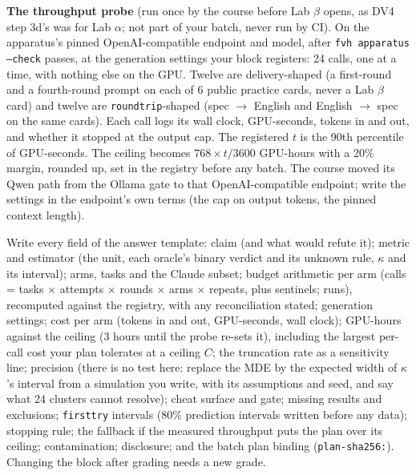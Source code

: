 \documentclass[11pt]{article}
\begin{document}
\begin{problem}
\textbf{The throughput probe} (run once by the course before Lab $\beta$
opens, as DV4 step 3d's was for Lab $\alpha$; not part of your batch, never
run by CI). On the apparatus's pinned
OpenAI-compatible endpoint and model, after \texttt{fvh apparatus --check}
passes, at the generation settings your block registers: 24 calls, one at a
time, with nothing else on the GPU. Twelve are delivery-shaped (a first-round
and a fourth-round prompt on each of 6 public practice cards, never a Lab
$\beta$ card) and twelve are \texttt{roundtrip}-shaped (spec $\to$ English and
English $\to$ spec on the same cards). Each call logs its wall clock,
GPU-seconds, tokens in and out, and whether it stopped at the output cap. The
registered $t$ is the 90th percentile of GPU-seconds. The ceiling becomes $768
\times t / 3600$ GPU-hours with a 20\% margin, rounded up, set in the
registry before any batch. The course moved its Qwen path from the Ollama
gate to that OpenAI-compatible endpoint; write the settings in the endpoint's
own terms (the cap on output tokens, the pinned context length).

Write every field of the answer template: claim (and what would refute it);
metric and estimator (the unit, each oracle's binary verdict and its unknown
rule, $\kappa$ and its interval); arms, tasks and the Claude subset; budget
arithmetic per arm (calls = tasks $\times$ attempts $\times$ rounds $\times$
arms $\times$ repeats, plus sentinels; runs), recomputed against the registry,
with any reconciliation stated; generation settings; cost per arm (tokens in
and out, GPU-seconds, wall clock); GPU-hours against the ceiling (3 hours until
the probe re-sets it), including the largest per-call cost your plan tolerates
at a ceiling $C$; the truncation rate as
a sensitivity line; precision (there is no test here: replace the MDE by the
expected width of $\kappa$'s interval from a simulation you write, with its
assumptions and seed, and say what 24 clusters cannot resolve); cheat surface
and gate; missing results and exclusions; \texttt{firsttry} intervals (80\%
prediction intervals written before any data); stopping rule; the fallback if
the measured throughput puts the plan over its ceiling; contamination;
disclosure; and the batch plan binding (\texttt{plan-sha256:}). Changing the
block after grading needs a new grade.
\end{problem}
\end{document}
